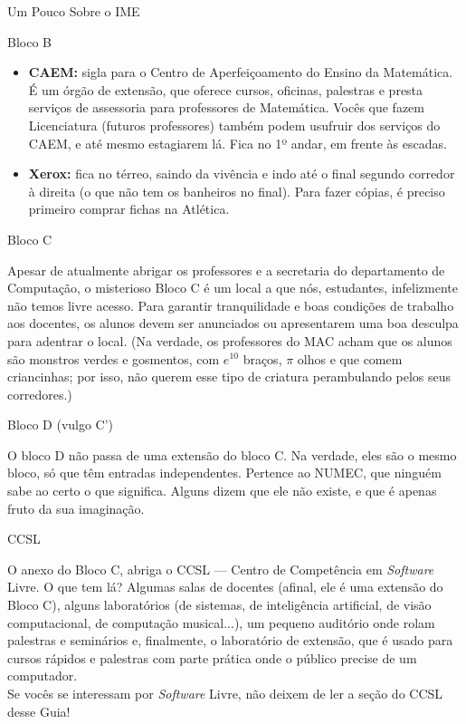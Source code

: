 \begin{secao}{Um Pouco Sobre o IME}
\begin{subsecao}{Bloco B}
\begin{itemize}
\item {\bf CAEM:} sigla para o Centro de Aperfeiçoamento do Ensino da
  Matemática. É um órgão de extensão, que oferece cursos, oficinas, palestras e
  presta serviços de assessoria para professores de Matemática. Vocês que fazem
  Licenciatura (futuros professores) também podem usufruir dos serviços do CAEM,
  e até mesmo estagiarem lá. Fica no 1º andar, em frente às escadas.

\item{\bf Xerox:} fica no térreo, saindo da vivência e indo até o final segundo
  corredor à direita (o que não tem os banheiros no final). Para fazer cópias,
  é preciso primeiro comprar fichas na Atlética.
\end{itemize}



\end{subsecao}

\begin{subsecao}{Bloco C}

Apesar de atualmente abrigar os professores e a secretaria do departamento de
Computação, o misterioso Bloco C é um local a que nós, estudantes, infelizmente não
temos livre acesso. Para garantir tranquilidade e boas condições de trabalho aos
docentes, os alunos devem ser anunciados ou apresentarem uma boa desculpa para
adentrar o local. (Na verdade, os professores do MAC acham que os alunos são monstros
verdes e gosmentos, com $e^{10}$ braços, $\pi$ olhos e que comem criancinhas;
por isso, não querem esse tipo de criatura perambulando pelos seus corredores.)

\end{subsecao}

\begin{subsecao}{Bloco D (vulgo C')}

O bloco D não passa de uma extensão do bloco C. Na verdade, eles são o mesmo bloco,
só que têm entradas independentes. Pertence ao NUMEC, que ninguém sabe ao certo
o que significa. Alguns dizem que ele não existe, e que é apenas fruto da sua
imaginação.

\end{subsecao}

\begin{subsecao}{CCSL}

O anexo do Bloco C, abriga o CCSL --- Centro de Competência em \textit{Software}
Livre. O que tem lá? Algumas salas de docentes (afinal, ele é uma extensão do
Bloco C), alguns laboratórios (de sistemas, de inteligência artificial,
de visão computacional, de computação musical...), um pequeno auditório
onde rolam palestras e seminários e, finalmente, o laboratório de extensão,
que é usado para cursos rápidos e palestras com parte prática onde o público
precise de um computador.\\
Se vocês se interessam por \textit{Software} Livre, não deixem de ler a seção
do CCSL desse Guia!


\end{subsecao}
\end{secao}
